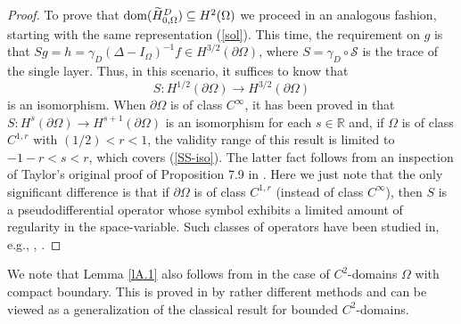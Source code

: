\documentclass[reqno,10pt, centertags]{amsart}
\newcommand{\bbR}{{\mathbb{R}}}
\newcommand{\wti}{\widetilde}
\newcommand{\ga}{\gamma}
\newcommand{\Om}{\Omega}
\newcommand{\dom}{\text{\rm{dom}}}
\numberwithin{equation}{section}
\theoremstyle{definition}
\begin{document}
\begin{proof}
To prove that $\dom(\wti H_{0,\Om}^D)\subseteq H^{2}(\Omega)$ we proceed
in an analogous fashion, starting with the same representation
(\ref{sol}). This time, the requirement on $g$ is that
$Sg=h=\ga_D(\Delta-I_{\Omega})^{-1}f\in H^{3/2}(\partial\Omega)$, where
$S=\ga_D\circ{\mathcal S}$ is the trace of the single layer. Thus,
in this scenario, it suffices to know that
\begin{equation}\label{SS-iso}
S\colon H^{1/2}(\partial\Omega)\rightarrow H^{3/2}(\partial\Omega)
\end{equation}
is an isomorphism. When $\partial\Omega$ is of class $C^\infty$, it
has been proved in \cite[Proposition 7.9]{Ta96} that
$S\colon H^{s}(\partial\Omega)\to H^{s+1}(\partial\Omega)$ is an
isomorphism for each $s\in\bbR$ and, if $\Om$ is of class $C^{1,r}$ with
$(1/2)<r< 1$, the validity range of this result is limited to
$-1-r<s<r$, which covers (\ref{SS-iso}). The latter fact follows from an
inspection of Taylor's original proof of Proposition 7.9 in \cite{Ta96}.
Here we just note that the only significant difference is that if
$\partial\Omega$ is of class $C^{1,r}$ (instead of class $C^\infty$), then
$S$ is a pseudodifferential operator whose symbol exhibits a limited
amount of regularity in the space-variable. Such classes of operators have
been studied in, e.g., \cite{MMT01}, \cite[Chs.\ 1, 2]{Ta91}.
\end{proof}

We note that Lemma \ref{lA.1} also follows from \cite[Theorem 8.2]{DHP03}
in the case of $C^2$-domains $\Om$ with compact boundary. This is proved
in \cite{DHP03} by rather different methods and can be viewed as a
generalization of the classical result for bounded $C^2$-domains.
\end{document}
